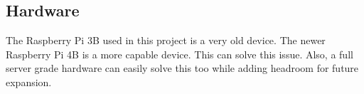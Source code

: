     \subsection{Hardware}
        \begin{flushleft}
            The Raspberry Pi 3B used in this project is a very old device. The newer Raspberry Pi 4B is a more capable
            device. This can solve this issue. Also, a full server grade hardware can easily solve this too while
            adding headroom for future expansion. 
        \end{flushleft}